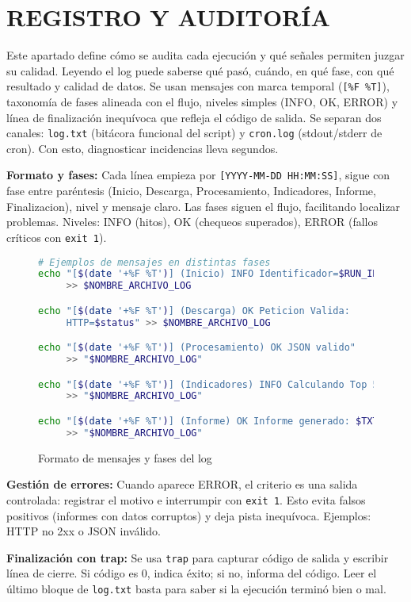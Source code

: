 \chapter{REGISTRO Y AUDITORÍA}

Este apartado define cómo se audita cada ejecución y qué señales permiten juzgar su calidad. Leyendo el log puede saberse qué pasó, cuándo, en qué fase, con qué resultado y calidad de datos. Se usan mensajes con marca temporal (\texttt{[\%F \%T]}), taxonomía de fases alineada con el flujo, niveles simples (INFO, OK, ERROR) y línea de finalización inequívoca que refleja el código de salida. Se separan dos canales: \texttt{log.txt} (bitácora funcional del script) y \texttt{cron.log} (stdout/stderr de cron). Con esto, diagnosticar incidencias lleva segundos.

\textbf{Formato y fases:} Cada línea empieza por \texttt{[YYYY-MM-DD HH:MM:SS]}, sigue con fase entre paréntesis (Inicio, Descarga, Procesamiento, Indicadores, Informe, Finalizacion), nivel y mensaje claro. Las fases siguen el flujo, facilitando localizar problemas. Niveles: INFO (hitos), OK (chequeos superados), ERROR (fallos críticos con \texttt{exit 1}).

\begin{figure}[H]
  \footnotesize
  \begin{lstlisting}[language=bash]
# Ejemplos de mensajes en distintas fases
echo "[$(date '+%F %T')] (Inicio) INFO Identificador=$RUN_ID" 
     >> $NOMBRE_ARCHIVO_LOG

echo "[$(date '+%F %T')] (Descarga) OK Peticion Valida: 
     HTTP=$status" >> $NOMBRE_ARCHIVO_LOG

echo "[$(date '+%F %T')] (Procesamiento) OK JSON valido" 
     >> "$NOMBRE_ARCHIVO_LOG"

echo "[$(date '+%F %T')] (Indicadores) INFO Calculando Top 5" 
     >> "$NOMBRE_ARCHIVO_LOG"

echo "[$(date '+%F %T')] (Informe) OK Informe generado: $TXT" 
     >> "$NOMBRE_ARCHIVO_LOG"
\end{lstlisting}
  \caption{Formato de mensajes y fases del log}
\end{figure}

\textbf{Gestión de errores:} Cuando aparece ERROR, el criterio es una salida controlada: registrar el motivo e interrumpir con \texttt{exit 1}. Esto evita falsos positivos (informes con datos corruptos) y deja pista inequívoca. Ejemplos: HTTP no 2xx o JSON inválido.

\textbf{Finalización con trap:} Se usa \texttt{trap} para capturar código de salida y escribir línea de cierre. Si código es 0, indica éxito; si no, informa del código. Leer el último bloque de \texttt{log.txt} basta para saber si la ejecución terminó bien o mal.

